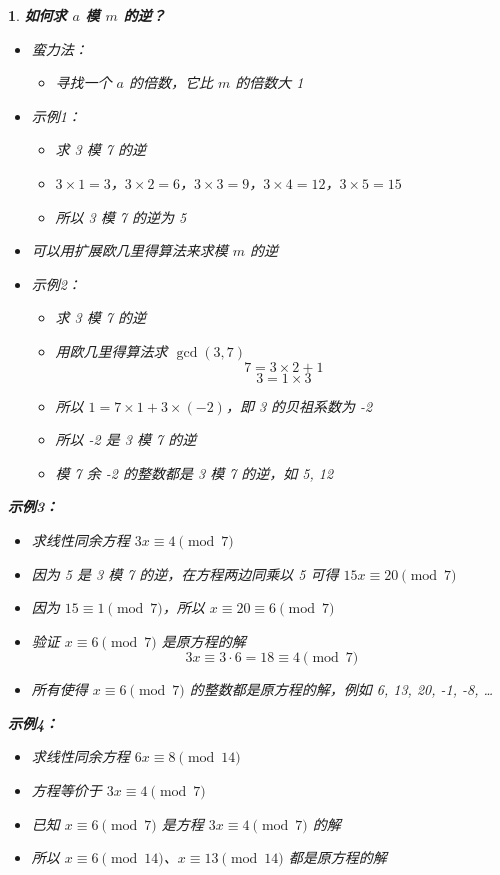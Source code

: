 \documentclass[UTF8]{report}
\theoremstyle{MyLineTheoremStyle} %
\theoremstyle{MyBlockTheoremStyle} %
\theoremstyle{MySubsubsectionStyle} %
\newtheorem{definition}{}
\begin{document}
\begin{definition}
    \textbf{如何求 $a$ 模 $m$ 的逆？}
    \begin{itemize}
        \item 蛮力法：
        \begin{itemize}
            \item 寻找一个 $a$ 的倍数，它比 $m$ 的倍数大 1
        \end{itemize}
        \item 示例1：
        \begin{itemize}
            \item 求 3 模 7 的逆
            \item $3 \times 1 = 3$，$3 \times 2 = 6$，$3 \times 3 = 9$，$3 \times 4 = 12$，$3 \times 5 = 15$
            \item 所以 3 模 7 的逆为 5
        \end{itemize}
        \item 可以用扩展欧几里得算法来求模 $m$ 的逆
        \item 示例2：
        \begin{itemize}
            \item 求 3 模 7 的逆
            \item 用欧几里得算法求 $\gcd(3, 7)$
            \[
            7 = 3 \times 2 + 1
            \]
            \[
            3 = 1 \times 3
            \]
            \item 所以 $1 = 7 \times 1 + 3 \times (-2)$，即 3 的贝祖系数为 -2
            \item 所以 -2 是 3 模 7 的逆
            \item 模 7 余 -2 的整数都是 3 模 7 的逆，如 5, 12
        \end{itemize}
    \end{itemize}

    \textbf{示例3：}
    \begin{itemize}
        \item 求线性同余方程 $3x \equiv 4 \pmod{7}$
        \item 因为 5 是 3 模 7 的逆，在方程两边同乘以 5 可得 $15x \equiv 20 \pmod{7}$
        \item 因为 $15 \equiv 1 \pmod{7}$，所以 $x \equiv 20 \equiv 6 \pmod{7}$
        \item 验证 $x \equiv 6 \pmod{7}$ 是原方程的解
        \[
        3x \equiv 3 \cdot 6 = 18 \equiv 4 \pmod{7}
        \]
        \item 所有使得 $x \equiv 6 \pmod{7}$ 的整数都是原方程的解，例如 6, 13, 20, -1, -8, …
    \end{itemize}

    \textbf{示例4：}
    \begin{itemize}
        \item 求线性同余方程 $6x \equiv 8 \pmod{14}$
        \item 方程等价于 $3x \equiv 4 \pmod{7}$
        \item 已知 $x \equiv 6 \pmod{7}$ 是方程 $3x \equiv 4 \pmod{7}$ 的解
        \item 所以 $x \equiv 6 \pmod{14}$、$x \equiv 13 \pmod{14}$ 都是原方程的解
    \end{itemize}
\end{definition}
\end{document}
